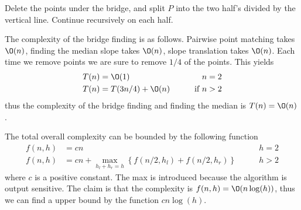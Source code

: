 \documentclass[10pt]{article}
\begin{document}
Delete the points under the bridge, and split $P$ into the two half's divided by the vertical line. Continue recursively on each half.

The complexity of the bridge finding is as follows. Pairwise point matching takes $\O(n)$, finding the median slope takes $\O(n)$, slope translation takes $\O(n)$. Each time we remove points we are sure to remove $1/4$ of the points. This yields 
\begin{align*}
T(n) &= \O(1) &\qquad n=2\\ 
T(n) &= T(3n/4) + \O(n) &\qquad \text{if } n>2
\end{align*}
thus the complexity of the bridge finding and finding the median is $T(n)=\O(n)$.

The total overall complexity can be bounded by the following function
\begin{align*}
f(n,h) &= cn &\qquad h=2  \\ 
f(n,h) &= cn + \max_{h_l+h_r = h}\left\{f(n/2,h_l)+f(n/2,h_r)\right\} &\qquad h>2
\end{align*}
where $c$ is a positive constant. The max is introduced because the algorithm is output sensitive. The claim is that the complexity is $f(n,h) = \O(n\log(h))$, thus we can find a upper bound by the function $cn\log(h)$.
\end{document}
